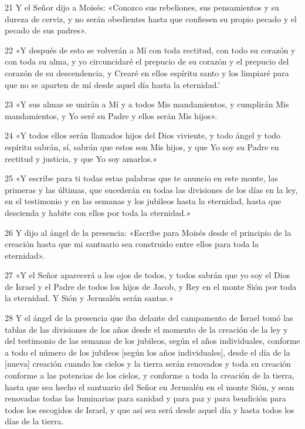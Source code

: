 \par 21 Y el Señor dijo a Moisés: «Conozco sus rebeliones, sus pensamientos y su dureza de cerviz, y no serán obedientes hasta que confiesen su propio pecado y el pecado de sus padres».
\par 22 «Y después de esto se volverán a Mí con toda rectitud, con todo su corazón y con toda su alma, y ​​yo circuncidaré el prepucio de su corazón y el prepucio del corazón de su descendencia, y Crearé en ellos espíritu santo y los limpiaré para que no se aparten de mí desde aquel día hasta la eternidad.'
\par 23 «Y sus almas se unirán a Mí y a todos Mis mandamientos, y cumplirán Mis mandamientos, y Yo seré su Padre y ellos serán Mis hijos».
\par 24 «Y todos ellos serán llamados hijos del Dios viviente, y todo ángel y todo espíritu sabrán, sí, sabrán que estos son Mis hijos, y que Yo soy su Padre en rectitud y justicia, y que Yo soy amarlos.»
\par 25 «Y escribe para ti todas estas palabras que te anuncio en este monte, las primeras y las últimas, que sucederán en todas las divisiones de los días en la ley, en el testimonio y en las semanas y los jubileos hasta la eternidad, hasta que descienda y habite con ellos por toda la eternidad.»
\par 26 Y dijo al ángel de la presencia: «Escribe para Moisés desde el principio de la creación hasta que mi santuario sea construido entre ellos para toda la eternidad».
\par 27 «Y el Señor aparecerá a los ojos de todos, y todos sabrán que yo soy el Dios de Israel y el Padre de todos los hijos de Jacob, y Rey en el monte Sión por toda la eternidad. Y Sión y Jerusalén serán santas.»
\par 28 Y el ángel de la presencia que iba delante del campamento de Israel tomó las tablas de las divisiones de los años desde el momento de la creación de la ley y del testimonio de las semanas de los jubileos, según el años individuales, conforme a todo el número de los jubileos [según los años individuales], desde el día de la [nueva] creación cuando los cielos y la tierra serán renovados y toda su creación conforme a las potencias de los cielos, y conforme a toda la creación de la tierra, hasta que sea hecho el santuario del Señor en Jerusalén en el monte Sión, y sean renovadas todas las luminarias para sanidad y para paz y para bendición para todos los escogidos de Israel, y que así sea será desde aquel día y hasta todos los días de la tierra.

